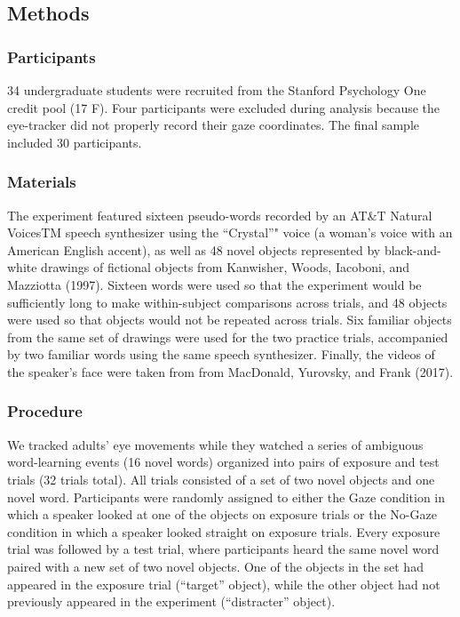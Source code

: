 \documentclass[man,floatsintext]{apa6}
\begin{document}
\subsection{Methods}\label{methods-1}

\subsubsection{Participants}\label{participants-1}

34 undergraduate students were recruited from the Stanford Psychology
One credit pool (17 F). Four participants were excluded during analysis
because the eye-tracker did not properly record their gaze coordinates.
The final sample included 30 participants.

\subsubsection{Materials}\label{materials-1}

The experiment featured sixteen pseudo-words recorded by an AT\&T
Natural VoicesTM speech synthesizer using the \enquote{Crystal}" voice
(a woman's voice with an American English accent), as well as 48 novel
objects represented by black-and-white drawings of fictional objects
from Kanwisher, Woods, Iacoboni, and Mazziotta (1997). Sixteen words
were used so that the experiment would be sufficiently long to make
within-subject comparisons across trials, and 48 objects were used so
that objects would not be repeated across trials. Six familiar objects
from the same set of drawings were used for the two practice trials,
accompanied by two familiar words using the same speech synthesizer.
Finally, the videos of the speaker's face were taken from from
MacDonald, Yurovsky, and Frank (2017).

\subsubsection{Procedure}\label{procedure-1}

We tracked adults' eye movements while they watched a series of
ambiguous word-learning events (16 novel words) organized into pairs of
exposure and test trials (32 trials total). All trials consisted of a
set of two novel objects and one novel word. Participants were randomly
assigned to either the Gaze condition in which a speaker looked at one
of the objects on exposure trials or the No-Gaze condition in which a
speaker looked straight on exposure trials. Every exposure trial was
followed by a test trial, where participants heard the same novel word
paired with a new set of two novel objects. One of the objects in the
set had appeared in the exposure trial (\enquote{target} object), while
the other object had not previously appeared in the experiment
(\enquote{distracter} object).
\end{document}
